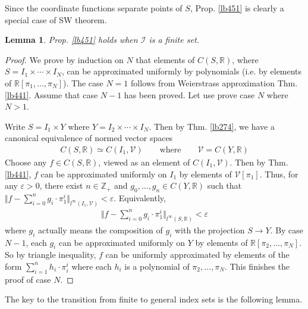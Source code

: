 \documentclass[12pt,b5paper,notitlepage]{article}
\theoremstyle{definition}
\theoremstyle{plain}
\newtheorem{lm}[df]{Lemma}
\newcommand{\mc}{\mathcal}
\newcommand{\scr}{\mathscr}
\newcommand{\Zbb}{\mathbb Z}
\newcommand{\Rbb}{\mathbb R}
\newcommand{\eps}{\varepsilon}
\numberwithin{equation}{section}
\begin{document}
Since the coordinate functions separate points of $S$, Prop. \ref{lb451} is clearly a special case of SW theorem.


\begin{lm}\label{lb456}
Prop. \ref{lb451} holds when $\scr I$ is a finite set.
\end{lm}

\begin{proof}
We prove by induction on $N$ that elements of $C(S,\Rbb)$, where $S=I_1\times\cdots\times I_N$, can be approximated uniformly by polynomials (i.e. by elements of $\Rbb[\pi_1,\dots,\pi_N]$). The case $N=1$ follows from Weierstrass approximation Thm. \ref{lb441}. Assume that case $N-1$ has been proved. Let use prove case $N$ where $N>1$. 

Write $S=I_1\times Y$ where $Y=I_2\times\cdots\times I_N$. Then by Thm. \ref{lb274}, we have a canonical equivalence of normed vector spaces
\begin{align*}
C(S,\Rbb)\simeq C(I_1,\mc V)\qquad\text{where}\qquad\mc V=C(Y,\Rbb)
\end{align*}
Choose any $f\in C(S,\Rbb)$, viewed as an element of $C(I_1,\mc V)$. Then by Thm. \ref{lb441}, $f$ can be approximated uniformly on $I_1$ by elements of $\mc V[\pi_1]$. Thus, for any $\eps>0$, there exist $n\in\Zbb_+$ and $g_0,\dots,g_n\in C(Y,\Rbb)$ such that $\Vert f-\sum_{i=0}^n g_i\cdot\pi_1^i\Vert_{l^\infty(I_1,\mc V)}<\eps$. Equivalently,
\begin{align*}
\Big\Vert f-\sum_{i=0}^n g_i\cdot \pi_1^i\Big\Vert_{l^\infty(S,\Rbb)}<\eps
\end{align*}
where $g_i$ actually means the composition of $g_i$ with the projection $S\rightarrow Y$. By case $N-1$, each $g_i$ can be approximated uniformly on $Y$ by elements of $\Rbb[\pi_2,\dots,\pi_N]$. So by triangle inequality, $f$ can be uniformly approximated by elements of the form $\sum_{i=1}^n h_i\cdot\pi_i^i$ where each $h_i$ is a polynomial of $\pi_2,\dots,\pi_N$. This finishes the proof of case $N$.
\end{proof}



The key to the transition from finite to general index sets is the following lemma.
\end{document}
